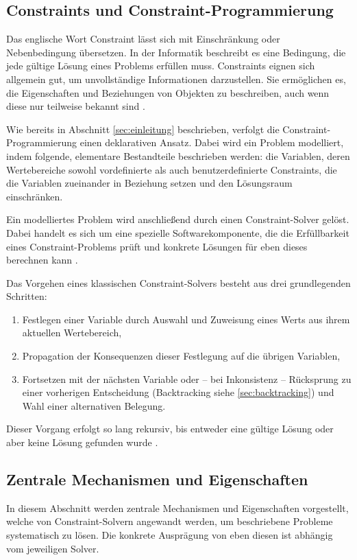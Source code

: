 \documentclass[12pt,a4paper]{article}
\begin{document}
\subsection{Constraints und Constraint-Programmierung}
Das englische Wort \glqq Constraint\grqq{} lässt sich mit Einschränkung oder Nebenbedingung übersetzen.
In der Informatik beschreibt es eine Bedingung, die jede gültige Lösung eines Problems erfüllen muss.
Constraints eignen sich allgemein gut, um unvollständige Informationen darzustellen.
Sie ermöglichen es, die Eigenschaften und Beziehungen von Objekten zu beschreiben, auch wenn diese nur teilweise bekannt sind \cite{clp_book}.

Wie bereits in Abschnitt \ref{sec:einleitung} beschrieben, verfolgt die Constraint-Programmierung einen deklarativen Ansatz.
Dabei wird ein Problem modelliert, indem folgende, elementare Bestandteile beschrieben werden: die Variablen, deren Wertebereiche sowohl vordefinierte als auch benutzerdefinierte Constraints, die die Variablen zueinander in Beziehung setzen und den Lösungsraum einschränken.

Ein modelliertes Problem wird anschließend durch einen Constraint-Solver gelöst.
Dabei handelt es sich um eine spezielle Softwarekomponente, die die Erfüllbarkeit eines Constraint-Problems prüft und konkrete Lösungen für eben dieses berechnen kann \cite{drt,clp_book2}.

\noindent
Das Vorgehen eines klassischen Constraint-Solvers besteht aus drei grundlegenden Schritten:
\begin{enumerate}
    \item Festlegen einer Variable durch Auswahl und Zuweisung eines Werts aus ihrem aktuellen Wertebereich,
    \item Propagation der Konsequenzen dieser Festlegung auf die übrigen Variablen,
    \item Fortsetzen mit der nächsten Variable oder -- bei Inkonsistenz -- Rücksprung zu einer vorherigen Entscheidung (Backtracking siehe \ref{sec:backtracking}) und Wahl einer alternativen Belegung.
\end{enumerate}
Dieser Vorgang erfolgt so lang rekursiv, bis entweder eine gültige Lösung oder aber keine Lösung gefunden wurde \cite{clp_book2}.
\subsection{Zentrale Mechanismen und Eigenschaften}
In diesem Abschnitt werden zentrale Mechanismen und Eigenschaften vorgestellt, welche von Constraint-Solvern angewandt werden, um beschriebene Probleme systematisch zu lösen. 
Die konkrete Ausprägung von eben diesen ist abhängig vom jeweiligen Solver.
\end{document}
